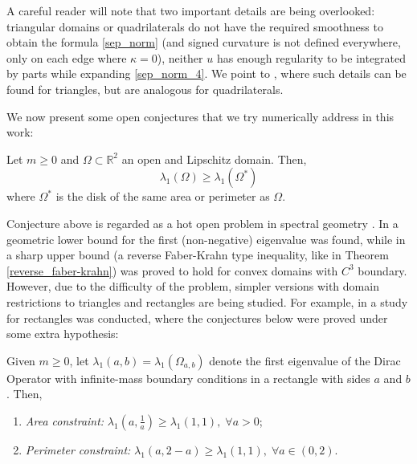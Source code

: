 \begin{remark}
    A careful reader will note that two important details are being overlooked: triangular domains or quadrilaterals do not have the required smoothness to obtain the formula \eqref{sep_norm} (and signed curvature is not defined everywhere, only on each edge where \(\kappa=0\)), neither \(u\) has enough regularity to be integrated by parts while expanding \eqref{sep_norm_4}. We point to \cite{vu2023spectral}, where such details can be found for triangles, but are analogous for quadrilaterals.
\end{remark}

We now present some open conjectures that we try numerically address in this work:

\begin{conjecture}
    Let \(m \geq 0\) and \(\Omega \subset \mathbb{R}^2\) an open and Lipschitz domain. Then,
    \[
    \lambda_1(\Omega) \geq \lambda_1(\Omega^\ast)
    \]
    where \(\Omega^\ast\) is the disk of the same area or perimeter as \(\Omega\).
\end{conjecture}
Conjecture above is regarded as a hot open problem in spectral geometry \cite{krejcirik_larson_lotoreichik_2019}. In \cite{benguria2017spectral} a geometric lower bound for the first (non-negative) eigenvalue was found, while in \cite{lotoreichik2019sharp} a sharp upper bound (a reverse Faber-Krahn type inequality, like in Theorem \ref*{reverse_faber-krahn}) was proved to hold for convex domains with \(C^3\) boundary. However, due to the difficulty of the problem, simpler versions with domain restrictions to triangles and rectangles are being studied. For example, in \cite{briet2022spectral} a study for rectangles was conducted, where the conjectures below were proved under some extra hypothesis:
\begin{conjecture}
    Given \(m \geq 0\), let \(\lambda_1(a, b) = \lambda_1(\Omega_{a, b})\) denote the first eigenvalue of the Dirac Operator with infinite-mass boundary conditions in a rectangle with sides \(a\) and \(b\). Then,
    \begin{enumerate}
        \item \textit{Area constraint: } \(\lambda_1(a, \frac{1}{a}) \geq \lambda_1(1, 1), \; \forall a>0 \);
        \item \textit{Perimeter constraint: } \(\lambda_1(a, 2-a) \geq \lambda_1(1, 1), \; \forall a\in (0, 2)\).
    \end{enumerate}
\end{conjecture}
